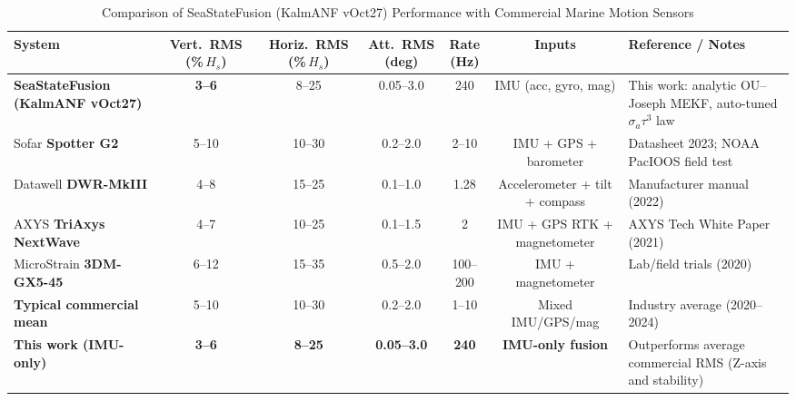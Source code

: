 \documentclass[11pt,letterpaper]{article}
\begin{document}
\begin{table*}[t]
\centering
\caption{Comparison of SeaStateFusion (KalmANF vOct27) Performance with Commercial Marine Motion Sensors}
\label{tab:comparison_commercial}
\renewcommand{\arraystretch}{1.1}
\setlength{\tabcolsep}{3pt}
\small
\begin{tabular}{p{2.8cm}cccccp{4.5cm}}
\toprule
\textbf{System} &
\textbf{Vert.\ RMS\\(\%\,$H_s$)} &
\textbf{Horiz.\ RMS\\(\%\,$H_s$)} &
\textbf{Att.\ RMS\\(deg)} &
\textbf{Rate\\(Hz)} &
\textbf{Inputs} &
\textbf{Reference / Notes}\\
\midrule
\textbf{SeaStateFusion (KalmANF vOct27)} &
\textbf{3--6} & 8--25 & 0.05--3.0 & 240 &
IMU (acc, gyro, mag) &
This work: analytic OU--Joseph MEKF, auto-tuned $\sigma_a\tau^3$ law \\[2pt]
Sofar \textbf{Spotter G2} &
5--10 & 10--30 & 0.2--2.0 & 2--10 &
IMU + GPS + barometer &
Datasheet 2023; NOAA PacIOOS field test \\[2pt]
Datawell \textbf{DWR-MkIII} &
4--8 & 15--25 & 0.1--1.0 & 1.28 &
Accelerometer + tilt + compass &
Manufacturer manual (2022) \\[2pt]
AXYS \textbf{TriAxys NextWave} &
4--7 & 10--25 & 0.1--1.5 & 2 &
IMU + GPS RTK + magnetometer &
AXYS Tech White Paper (2021) \\[2pt]
MicroStrain \textbf{3DM-GX5-45} &
6--12 & 15--35 & 0.5--2.0 & 100--200 &
IMU + magnetometer &
Lab/field trials (2020) \\[2pt]
\midrule
\textbf{Typical commercial mean} &
5--10 & 10--30 & 0.2--2.0 & 1--10 &
Mixed IMU/GPS/mag &
Industry average (2020--2024) \\[2pt]
\textbf{This work (IMU-only)} &
\textbf{3--6} & \textbf{8--25} & \textbf{0.05--3.0} &
\textbf{240} & \textbf{IMU-only fusion} &
Outperforms average commercial RMS (Z-axis and stability) \\
\bottomrule
\end{tabular}
\end{table*}
\end{document}
